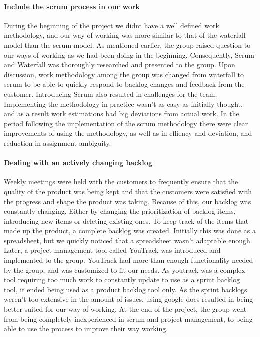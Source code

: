 \paragraph{Include the scrum process in our work} During the beginning of the project we didnt have a well defined work methodology, and our way of working was more similar to that of the waterfall model than the scrum model. As mentioned earlier, the group raised question to our ways of working as we had been doing in the beginning. Consequently, Scrum and Waterfall was thoroughly researched and presented to the group. Upon discussion, work methodology among the group was changed from waterfall to scrum to be able to quickly respond to backlog changes and feedback from the customer. Introducing Scrum also resulted in challenges for the team. Implementing the methodology in practice wasn’t as easy as initially thought, and as a result work estimations had big deviations from actual work. In the period following the implementation of the scrum methodology there were clear improvements of using the methodology, as well as in effiency and deviation, and reduction in assignment ambiguity. 
\paragraph{Dealing with an actively changing backlog} Weekly meetings were held with the customers to frequently ensure that the quality of the product was being kept and that the customers were satisfied with the progress and shape the product was taking. Because of this, our backlog was constantly changing. Either by changing the prioritization of backlog items, introducing new items or deleting existing ones. To keep track of the items that made up the product, a complete backlog was created. Initially this was done as a spreadsheet, but we quickly noticed that a spreadsheet wasn’t adaptable enough. Later, a project management tool called YouTrack was introduced and implemented to the group. YouTrack had more than enough functionality needed by the group, and was customized to fit our needs. As youtrack was a complex tool requiring too much work to constantly update to use as a sprint backlog tool, it ended being used as a product backlog tool only. As the sprint backlogs weren’t too extensive in the amount of issues, using google docs resulted in being better suited for our way of working. At the end of the project, the group went from being completely inexperienced in scrum and project management, to being able to use the process to improve their way working.
